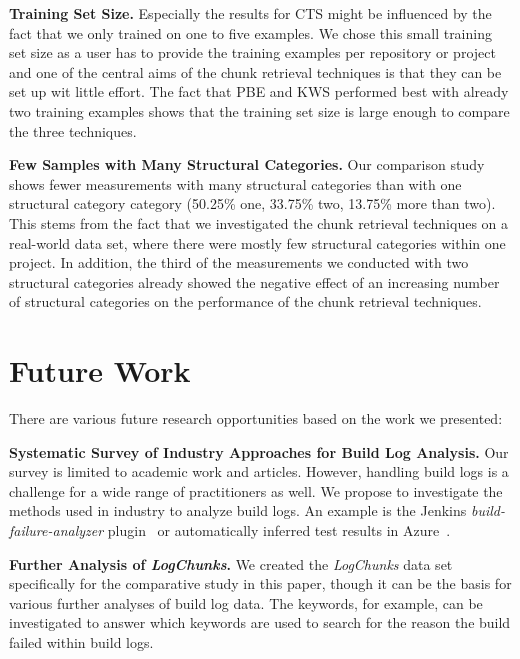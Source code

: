 \textbf{Training Set Size.}
Especially the results for CTS might be influenced by the fact that we
only trained on one to five examples.
We chose this small training set
size as a user has to provide the training examples
per repository or project and one of the central aims of the chunk
retrieval techniques is that they can be set up wit little effort.
The fact that PBE and KWS performed best with already two training
examples shows that the training set size is large enough to
compare the three techniques.

\textbf{Few Samples with Many Structural Categories.}
Our comparison study shows fewer measurements with many structural
categories than with one structural category category (50.25\% one,
33.75\% two, 13.75\% more than two).
This stems from the fact that we
investigated the chunk retrieval techniques on a real-world data set,
where there were mostly few structural categories within one project.
In addition, the third of the measurements we conducted with two
structural categories already showed the negative effect of an
increasing number of structural categories on the performance of the
chunk retrieval techniques.

\section{Future Work}

There are various future research opportunities based on the
work we presented:

\textbf{Systematic Survey of Industry Approaches for Build
Log Analysis.}
Our survey is limited to academic work and articles.
However, handling build logs is a challenge for a wide range of
practitioners as well.
We propose to investigate the methods used in industry to analyze
build logs.
An example is the Jenkins \emph{build-failure-analyzer}
plugin~\cite{jenkins2020failure-analyzer} or automatically
inferred test results in Azure~\cite{azure2020inferred}.

\textbf{Further Analysis of \emph{LogChunks}.}
We created the
\emph{LogChunks} data set \cite{brandt2020logchunks} specifically for
the comparative
study in this paper, though it can be the basis for various further
analyses of build log data.
The keywords, for example, can be
investigated to answer which keywords are used to search for the
reason the build failed within build logs.

